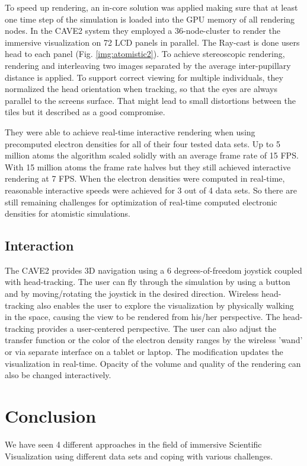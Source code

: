 \documentclass[10pt,twocolumn,letterpaper]{article}
\begin{document}
\setlength{\parindent}{1pc}To speed up rendering, an in-core solution was applied making sure that at least one time step of the simulation is loaded into the GPU memory of all rendering nodes. In the CAVE2 \cite{febretti2013cave2} system they employed a 36-node-cluster to render the immersive visualization on 72 LCD panels in parallel. The Ray-cast is done users head to each panel (Fig. \ref{img:atomistic2}). To achieve stereoscopic rendering, rendering and interleaving two images separated by the average inter-pupillary distance is applied. To support correct viewing for multiple individuals, they normalized the head orientation when tracking, so that the eyes are always parallel to the screens surface. That might lead to small distortions between the tiles but it described as a good compromise. 

\setlength{\parindent}{1pc}They were able to achieve real-time interactive rendering when using precomputed electron densities for all of their four tested data sets. Up to 5 million atoms the algorithm scaled solidly with an average frame rate of 15 FPS. With 15 million atoms the frame rate halves but they still achieved interactive rendering at 7 FPS. When the electron densities were computed in real-time, reasonable interactive speeds were achieved for 3 out of 4 data sets. So there are still remaining challenges for optimization of real-time computed electronic densities for atomistic simulations.

\subsection{Interaction}
The CAVE2 \cite{febretti2013cave2} provides 3D navigation using a 6 degrees-of-freedom joystick coupled with head-tracking. The user can fly through the simulation by using a button and by moving/rotating the joystick in the desired direction. Wireless head-tracking also enables the user to explore the visualization by physically walking in the space, causing the view to be rendered from his/her perspective. The head-tracking provides a user-centered perspective. The user can also adjust the transfer function or the color of the electron density ranges by the wireless 'wand' or via separate interface on a tablet or laptop. The modification updates the visualization in real-time. Opacity of the volume and quality of the rendering can also be changed interactively.

\section{Conclusion}
We have seen 4 different approaches in the field of immersive Scientific Visualization using different data sets and coping with various challenges. 
\end{document}
